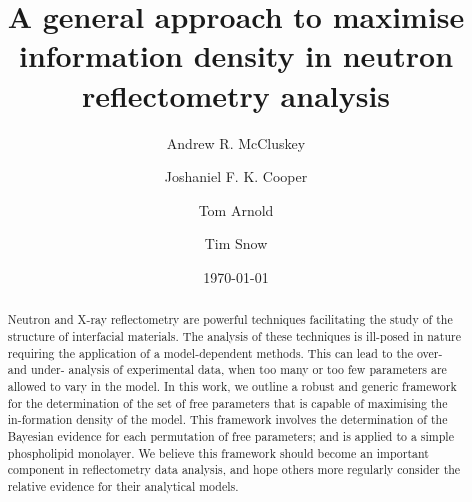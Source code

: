 \documentclass[%
 reprint,
 superscriptaddress,
 amsmath,amssymb,
 aps,
]{revtex4-1}
\begin{document}

\title{A general approach to maximise information density in neutron reflectometry analysis}

\author{Andrew R. McCluskey}

\author{Joshaniel F. K. Cooper}
 
\author{Tom Arnold}

\author{Tim Snow}

\date{\today}

\begin{abstract}
Neutron and X-ray reflectometry are powerful techniques facilitating the study of the structure of interfacial materials.
The analysis of these techniques is ill-posed in nature requiring the application of a model-dependent methods.
This can lead to the over- and under- analysis of experimental data, when too many or too few parameters are allowed to vary in the model. 
In this work, we outline a robust and generic framework for the determination of the set of free parameters that is capable of maximising the in-formation density of the model. 
This framework involves the determination of the Bayesian evidence for each permutation of free parameters; and is applied to a simple phospholipid monolayer. 
We believe this framework should become an important component in reflectometry data analysis, and hope others more regularly consider the relative evidence for their analytical models.
\end{abstract}
\end{document}
